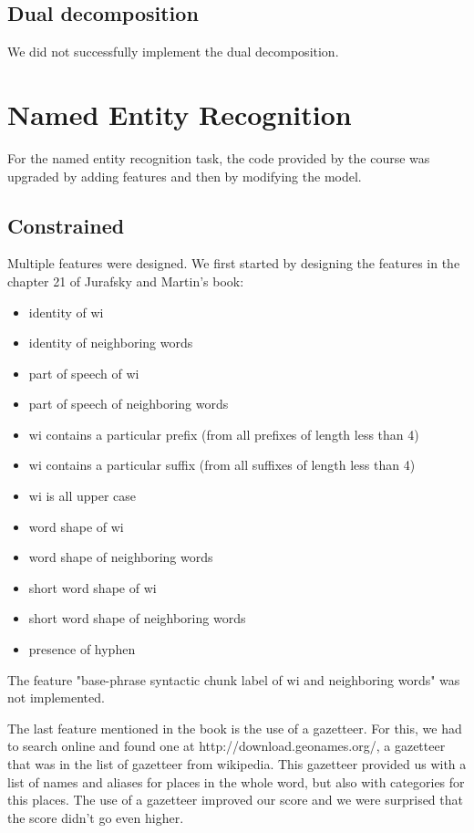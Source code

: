 \documentclass{article}
\begin{document}
\subsection{Dual decomposition}
We did not successfully implement the dual decomposition.

\section{Named Entity Recognition}

For the named entity recognition task, the code provided by the course was upgraded by adding features and then by modifying the model.

\subsection{Constrained}

Multiple features were designed. We first started by designing the features in the chapter 21 of Jurafsky and Martin's book:
\begin{itemize}  
	\item identity of wi
	\item identity of neighboring words
	\item part of speech of wi
	\item part of speech of neighboring words
	\item wi contains a particular prefix (from all prefixes of length less than 4)
	\item wi contains a particular suffix (from all suffixes of length less than 4)
	\item wi is all upper case
	\item word shape of wi
	\item word shape of neighboring words
	\item short word shape of wi
	\item short word shape of neighboring words
	\item presence of hyphen 
\end{itemize}

The feature "base-phrase syntactic chunk label of wi and neighboring words" was not implemented.

The last feature mentioned in the book is the use of a gazetteer. For this, we had to search online and found one at http://download.geonames.org/, a gazetteer that was in the list of gazetteer from wikipedia. This gazetteer provided us with a list of names and aliases for places in the whole word, but also with categories for this places. The use of a gazetteer improved our score and we were surprised that the score didn't go even higher. 
\end{document}
